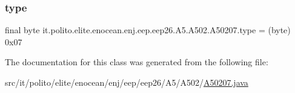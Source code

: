 \subsubsection{\texorpdfstring{type}{type}}
{\footnotesize\ttfamily final byte it.\+polito.\+elite.\+enocean.\+enj.\+eep.\+eep26.\+A5.\+A502.\+A50207.\+type = (byte) 0x07\hspace{0.3cm}{\ttfamily [static]}}



The documentation for this class was generated from the following file\+:\begin{DoxyCompactItemize}
\item 
src/it/polito/elite/enocean/enj/eep/eep26/\+A5/\+A502/\hyperlink{_a50207_8java}{A50207.\+java}\end{DoxyCompactItemize}
